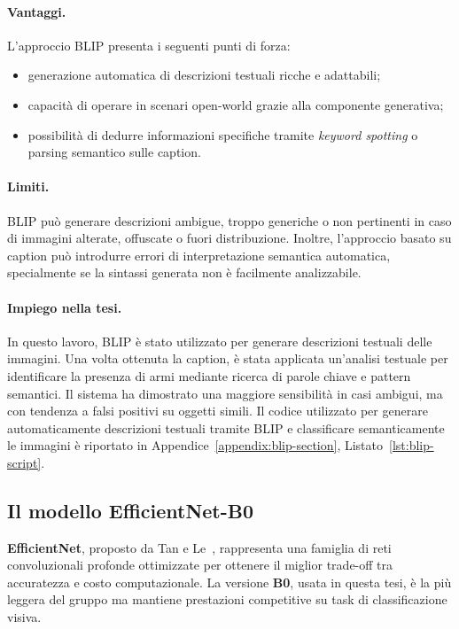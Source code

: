 \paragraph{Vantaggi.} L’approccio BLIP presenta i seguenti punti di forza:
\begin{itemize}
\item generazione automatica di descrizioni testuali ricche e adattabili;
\item capacità di operare in scenari open-world grazie alla componente generativa;
\item possibilità di dedurre informazioni specifiche tramite \textit{keyword spotting} o parsing semantico sulle caption.
\end{itemize}

\paragraph{Limiti.} BLIP può generare descrizioni ambigue, troppo generiche o non pertinenti in caso di immagini alterate, offuscate o fuori distribuzione. Inoltre, l’approccio basato su caption può introdurre errori di interpretazione semantica automatica, specialmente se la sintassi generata non è facilmente analizzabile.

\paragraph{Impiego nella tesi.} In questo lavoro, BLIP è stato utilizzato per generare descrizioni testuali delle immagini. Una volta ottenuta la caption, è stata applicata un’analisi testuale per identificare la presenza di armi mediante ricerca di parole chiave e pattern semantici. Il sistema ha dimostrato una maggiore sensibilità in casi ambigui, ma con tendenza a falsi positivi su oggetti simili.
Il codice utilizzato per generare automaticamente descrizioni testuali tramite BLIP e classificare semanticamente le immagini è riportato in Appendice~\ref{appendix:blip-section}, Listato~\ref{lst:blip-script}.



\subsection*{Il modello EfficientNet-B0}
\label{sec:efficientnet-model}

\textbf{EfficientNet}, proposto da Tan e Le~\cite{tan2019efficientnet}, rappresenta una famiglia di reti convoluzionali profonde ottimizzate per ottenere il miglior trade-off tra accuratezza e costo computazionale. La versione \textbf{B0}, usata in questa tesi, è la più leggera del gruppo ma mantiene prestazioni competitive su task di classificazione visiva.

